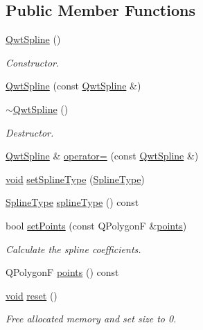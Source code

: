 \subsection*{Public Member Functions}
\begin{DoxyCompactItemize}
\item 
\hyperlink{class_qwt_spline_a5d1e0ba35c637a88c66d9e4cbaf36e93}{Qwt\-Spline} ()
\begin{DoxyCompactList}\small\item\em Constructor. \end{DoxyCompactList}\item 
\hyperlink{class_qwt_spline_a2e42391f76d0b3091bf7754239f3ff0d}{Qwt\-Spline} (const \hyperlink{class_qwt_spline}{Qwt\-Spline} \&)
\item 
\hyperlink{class_qwt_spline_a90805882826469c94fdc871f18261bb6}{$\sim$\-Qwt\-Spline} ()
\begin{DoxyCompactList}\small\item\em Destructor. \end{DoxyCompactList}\item 
\hyperlink{class_qwt_spline}{Qwt\-Spline} \& \hyperlink{class_qwt_spline_a8a597c34477dd4b5298db2d445b4e596}{operator=} (const \hyperlink{class_qwt_spline}{Qwt\-Spline} \&)
\item 
\hyperlink{group___u_a_v_objects_plugin_ga444cf2ff3f0ecbe028adce838d373f5c}{void} \hyperlink{class_qwt_spline_a222953661f01658a16042d587196aff8}{set\-Spline\-Type} (\hyperlink{class_qwt_spline_a2bd2bda128f82acd596348eb8d64231c}{Spline\-Type})
\item 
\hyperlink{class_qwt_spline_a2bd2bda128f82acd596348eb8d64231c}{Spline\-Type} \hyperlink{class_qwt_spline_a36442cbb781422e5b97ae242265dd4b4}{spline\-Type} () const 
\item 
bool \hyperlink{class_qwt_spline_a6ed13410b1d5f6b33ba0e3c2b07932cf}{set\-Points} (const Q\-Polygon\-F \&\hyperlink{glext_8h_ae75d9f560170dfeaadc8718c87f5fbec}{points})
\begin{DoxyCompactList}\small\item\em Calculate the spline coefficients. \end{DoxyCompactList}\item 
Q\-Polygon\-F \hyperlink{class_qwt_spline_a14694e61052933921eda629062554d22}{points} () const 
\item 
\hyperlink{group___u_a_v_objects_plugin_ga444cf2ff3f0ecbe028adce838d373f5c}{void} \hyperlink{class_qwt_spline_afc52fd49e7f00d57a0336059fae299c0}{reset} ()
\begin{DoxyCompactList}\small\item\em Free allocated memory and set size to 0. \end{DoxyCompactList}\item 

\end{DoxyCompactItemize}
